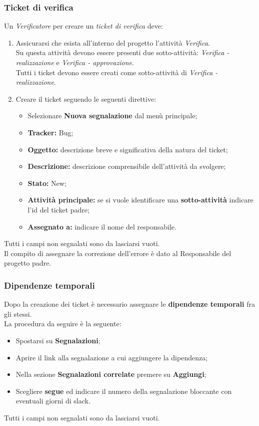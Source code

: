       \subsubsection{Ticket di verifica}
        Un \emph{Verificatore} per creare un \emph{ticket di verifica} deve:
        \begin{enumerate}
          \item Assicurarsi che esista all'interno del progetto l'attività \emph{Verifica}.\\
          Su questa attività devono essere presenti due sotto-attività: \emph{Verifica - realizzazione} e \emph{Verifica - approvazione}.\\
          Tutti i ticket devono essere creati come sotto-attività di \emph{Verifica - realizzazione}.
          \item Creare il ticket seguendo le seguenti direttive:
          \bgroup
            \begin{itemize}
              \item Selezionare \textbf{Nuova segnalazione} dal menù principale;
              \item \textbf{Tracker: }Bug;
              \item \textbf{Oggetto: }descrizione breve e significativa della natura del ticket;
              \item \textbf{Descrizione: }descrizione comprensibile dell'attività da svolgere;
              \item \textbf{Stato: }New;
              \item \textbf{Attività principale: }se si vuole identificare una \textbf{sotto-attività} indicare l'id del ticket padre;
              \item \textbf{Assegnato a: }indicare il nome del responsabile.
            \end{itemize}
          \egroup
        \end{enumerate}
      Tutti i campi non segnalati sono da lasciarsi vuoti.\\
      Il compito di assegnare la correzione dell'errore è dato al Responsabile del progetto padre.
    \subsubsection{Dipendenze temporali}
      Dopo la creazione dei ticket è necessario assegnare le \textbf{dipendenze temporali} fra gli stessi.\\
      La procedura da seguire è la seguente:
      \begin{itemize}
        \item Spostarsi su \textbf{Segnalazioni};
        \item Aprire il link alla segnalazione a cui aggiungere la dipendenza;
        \item Nella sezione \textbf{Segnalazioni correlate} premere su \textbf{Aggiungi};
        \item Scegliere \textbf{segue} ed indicare il numero della segnalazione bloccante con eventuali giorni di slack.
      \end{itemize}
      Tutti i campi non segnalati sono da lasciarsi vuoti.
